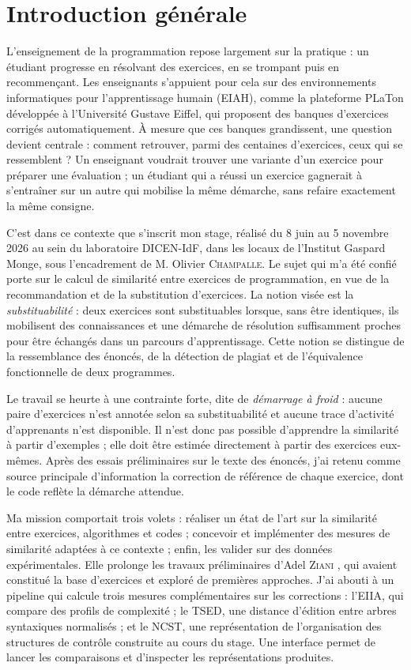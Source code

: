 \documentclass[12pt,a4paper,oneside]{report}
\begin{document}
\chapter*{Introduction générale}
L'enseignement de la programmation repose largement sur la pratique : un
étudiant progresse en résolvant des exercices, en se trompant puis en
recommençant. Les enseignants s'appuient pour cela sur des environnements
informatiques pour l'apprentissage humain (EIAH), comme la plateforme
PLaTon développée à l'Université Gustave Eiffel, qui proposent des banques
d'exercices corrigés automatiquement. À mesure que ces banques grandissent,
une question devient centrale : comment retrouver, parmi des centaines
d'exercices, ceux qui se ressemblent ? Un enseignant voudrait trouver une
variante d'un exercice pour préparer une évaluation ; un étudiant qui a
réussi un exercice gagnerait à s'entraîner sur un autre qui mobilise la
même démarche, sans refaire exactement la même consigne.

C'est dans ce contexte que s'inscrit mon stage, réalisé du 8 juin au
5 novembre 2026 au sein du laboratoire DICEN-IdF, dans les locaux de
l'Institut Gaspard Monge, sous l'encadrement de M. Olivier
\textsc{Champalle}. Le sujet qui m'a été confié porte sur le calcul de
similarité entre exercices de programmation, en vue de la recommandation
et de la substitution d'exercices. La notion visée est la
\emph{substituabilité} : deux exercices sont substituables lorsque, sans
être identiques, ils mobilisent des connaissances et une démarche de
résolution suffisamment proches pour être échangés dans un parcours
d'apprentissage. Cette notion se distingue de la ressemblance des énoncés,
de la détection de plagiat et de l'équivalence fonctionnelle de deux
programmes.

Le travail se heurte à une contrainte forte, dite de \emph{démarrage à
froid} : aucune paire d'exercices n'est annotée selon sa substituabilité et
aucune trace d'activité d'apprenants n'est disponible. Il n'est donc pas
possible d'apprendre la similarité à partir d'exemples ; elle doit être
estimée directement à partir des exercices eux-mêmes. Après des essais
préliminaires sur le texte des énoncés, j'ai retenu comme source principale
d'information la correction de référence de chaque exercice, dont le code
reflète la démarche attendue.

Ma mission comportait trois volets : réaliser un état de l'art sur la
similarité entre exercices, algorithmes et codes ; concevoir et implémenter
des mesures de similarité adaptées à ce contexte ; enfin, les valider sur
des données expérimentales. Elle prolonge les travaux préliminaires d'Adel
\textsc{Ziani} \cite{ziani_detection_2025}, qui avaient constitué la base
d'exercices et exploré de premières approches.
J'ai abouti à un pipeline qui calcule trois mesures complémentaires sur les
corrections : l'EIIA, qui compare des profils de complexité ; le TSED, une
distance d'édition entre arbres syntaxiques normalisés ; et le NCST, une
représentation de l'organisation des structures de contrôle construite au
cours du stage. Une interface permet de lancer les comparaisons et
d'inspecter les représentations produites.
\end{document}
